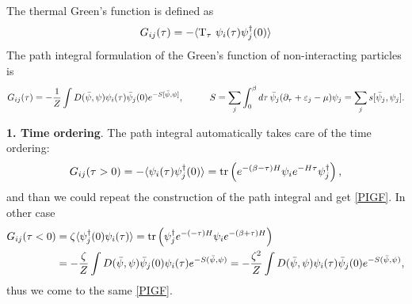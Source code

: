 The thermal Green's function is defined as 
\begin{equation*}
	G_{ij}(\tau) = - \langle \text{T}_\tau\ \psi_i(\tau) \psi_j\D (0) \rangle
\end{equation*}
The path integral formulation of the Green's function of non-interacting particles is
\begin{equation}
	G_{ij}(\tau) = - \frac{1}{Z} \int D(\bar{\psi}, \psi) \psi_i(\tau) \bar{\psi}_j(0) e^{-S[\bar{\psi}, \psi]},
	\hspace{10 mm} 
	S = \sum_j \int_0^\beta d\tau\, \bar{\psi}_j (\partial_\tau + \varepsilon_j - \mu) \psi_j = \sum_j 
	s[\bar{\psi}_j, \psi_j].
	\label{PIGF}
\end{equation}

\textbf{1. Time ordering}. 
The path integral automatically takes care of the time ordering:
\begin{equation*}
	G_{ij}(\tau>0) = -\langle \psi_i(\tau) \psi_j^{\dag}(0)\rangle = \mathop{\mathrm{tr}}\nolimits\left(
		e^{-(\beta-\tau) H}  \psi_i e^{-H \tau} \psi_j^{\dag}
	\right),
\end{equation*}
and than we could repeat the construction of the path integral and get \eqref{PIGF}. In other case
\begin{align*}
	G_{ij}(\tau<0) &= \zeta \langle \psi_j^{\dag}(0) \psi_i(\tau)\rangle = 
		\mathop{\mathrm{tr}}\nolimits\left(
		 \psi_j^{\dag}  e^{-(-\tau)H} \psi_i e^{-(\beta+\tau)H}
	\right)
	\\
	&= - \frac{\zeta}{Z} \int D(\bar{\psi}, \psi) \bar{\psi}_j(0) \psi_i(\tau)  e^{-S(\bar{\psi}, \psi)} = - \frac{\zeta^2 }{Z} \int D(\bar{\psi}, \psi) \psi_i(\tau) \bar{\psi}_j(0) e^{-S(\bar{\psi}, \psi)},
\end{align*}
thus we come to the same \eqref{PIGF}.


